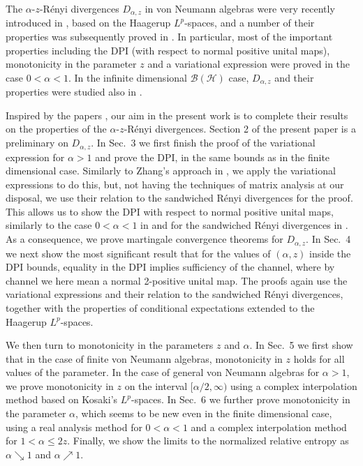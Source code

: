 \documentclass[12pt]{article}
\theoremstyle{definition}
\theoremstyle{remark}
\numberwithin{equation}{section}
\begin{document}
The $\alpha$-$z$-R\'enyi divergences $D_{\alpha,z}$ in von Neumann algebras were very recently
introduced in \cite{kato2023aremark}, {based on the Haagerup $L^p$-spaces}, and a number of
their properties was subsequently proved in \cite{kato2023onrenyi}. In particular, most of the important
properties including the DPI (with respect to normal positive unital maps), monotonicity in the parameter $z$
and a variational expression were proved in the case $0<\alpha<1$. In the infinite dimensional
$\mathcal{B}(\mathcal{H})$ case, $D_{\alpha,z}$ and their properties were studied also in
\cite{mosonyi2023thestrong}.


Inspired by the papers \cite{kato2023aremark, kato2023onrenyi}, our aim in the present
work is to complete their results on the properties of the $\alpha$-$z$-R\'enyi divergences.
{Section 2 of the present paper is a preliminary on $D_{\alpha,z}$. In Sec.~3} we first finish
the proof of the variational expression for $\alpha>1$ and prove the DPI, in the same bounds as in the
finite dimensional case. Similarly to Zhang's approach in \cite{zhang2020fromwyd}, we apply the
variational expressions to {do} this, but, not having the techniques of matrix analysis
at our disposal, we use their relation to the sandwiched R\'enyi divergences for the proof. This allows us
to show the DPI with respect to normal positive unital maps, similarly to the case $0<\alpha<1$
in \cite{kato2023onrenyi} and for the sandwiched R\'enyi divergences in
\cite{jencova2018renyi,jencova2021renyi}. As a consequence, we prove martingale convergence
theorems for $D_{\alpha,z}$. In Sec.~4 we next show the most significant result that for the
values of $(\alpha,z)$ inside the DPI bounds, equality in the DPI implies sufficiency of the channel,
where by channel we here mean a normal 2-positive unital map. The proofs again use the variational
expressions and their relation to the sandwiched R\'enyi divergences, together with the properties of
conditional expectations extended to the Haagerup $L^p$-spaces.

We then turn to monotonicity in the parameters $z$ and $\alpha$. In Sec.~5 we first show that in the
case of finite von Neumann algebras,  monotonicity in $z$ holds for all values of the parameter. 
In the case of general von Neumann algebras for $\alpha>1$, we prove monotonicity in $z$
on the interval $[\alpha/2,\infty)$ using a complex interpolation method
based on Kosaki's $L^p$-spaces. In Sec.~6 we further prove monotonicity in the parameter
$\alpha$, which seems to be new even in the finite dimensional case, using a real analysis method
for $0<\alpha<1$ and a complex interpolation method for $1<\alpha\le2z$. Finally, we show the limits
to the normalized relative entropy as $\alpha\searrow 1$ and $\alpha\nearrow 1$.
\end{document}
